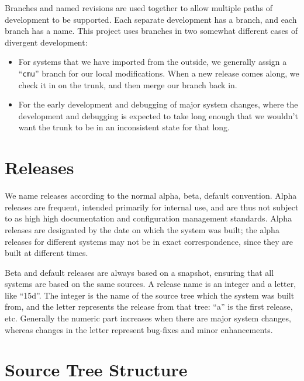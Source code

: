 Branches and named revisions are used together to allow multiple paths of
development to be supported.  Each separate development has a branch, and each
branch has a name.  This project uses branches in two somewhat different cases
of divergent development:
\begin{itemize}
\item For systems that we have imported from the outside, we generally assign a
``{\tt cmu}'' branch for our local modifications.  When a new release comes
along, we check it in on the trunk, and then merge our branch back in.

\item For the early development and debugging of major system changes, where
the development and debugging is expected to take long enough that we wouldn't
want the trunk to be in an inconsistent state for that long.
\end{itemize}

\section{Releases}

We name releases according to the normal alpha, beta, default convention.
Alpha releases are frequent, intended primarily for internal use, and are thus
not subject to as high high documentation and configuration management
standards.  Alpha releases are designated by the date on which the system was
built; the alpha releases for different systems may not be in exact
correspondence, since they are built at different times.

Beta and default releases are always based on a snapshot, ensuring that all
systems are based on the same sources.  A release name is an integer and a
letter, like ``15d''.  The integer is the name of the source tree which the
system was built from, and the letter represents the release from that tree:
``a'' is the first release, etc.  Generally the numeric part increases when
there are major system changes, whereas changes in the letter represent
bug-fixes and minor enhancements.

\section{Source Tree Structure}

